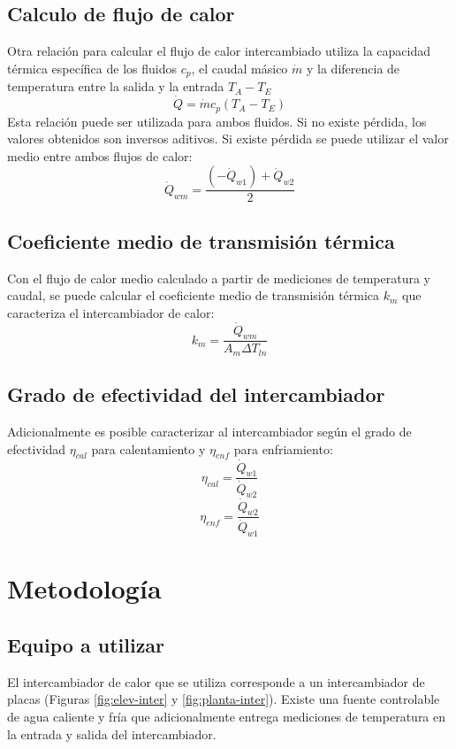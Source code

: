\documentclass[letterpaper,11pt]{article} %
\begin{document}
\subsection{Calculo de flujo de calor}
Otra relación para calcular el flujo de calor intercambiado utiliza la capacidad térmica específica de los fluidos $c_p$, el caudal másico $\dot{m}$ y la diferencia de temperatura entre la salida y la entrada $T_{A}-T_{E}$
\begin{equation}
\dot{Q} = \dot{m}c_p (T_{A}-T_{E})
\end{equation}
Esta relación puede ser utilizada para ambos fluidos. Si no existe pérdida, los valores obtenidos son inversos aditivos. Si existe pérdida se puede utilizar el valor medio entre ambos flujos de calor:
\begin{equation}
\dot{Q}_{wm} = \frac{(-\dot{Q}_{w1}) + \dot{Q}_{w2}}{2}
\end{equation} 
\subsection{Coeficiente medio de transmisión térmica}
Con el flujo de calor medio calculado a partir de mediciones de temperatura y caudal, se puede calcular el coeficiente medio de transmisión térmica $k_m$ que caracteriza el intercambiador de calor:
\begin{equation}
k_m = \frac{\dot{Q}_{wm}}{A_m \Delta T_{ln}}
\end{equation}
\subsection{Grado de efectividad del intercambiador}
Adicionalmente es posible caracterizar al intercambiador según el grado de efectividad $\eta_{cal}$ para calentamiento y $\eta_{enf}$ para enfriamiento:
\begin{equation}
\eta_{cal} = \frac{\dot{Q}_{w1}}{\dot{Q}_{w2}}
\end{equation} 
\begin{equation}
\eta_{enf} = \frac{\dot{Q}_{w2}}{\dot{Q}_{w1}}
\end{equation}



\newpage

\section{Metodología}
\subsection{Equipo a utilizar}
El intercambiador de calor que se utiliza corresponde a un intercambiador de placas (Figuras \ref{fig:elev-inter} y \ref{fig:planta-inter}). Existe una fuente controlable de agua caliente y fría que adicionalmente entrega mediciones de temperatura en la entrada y salida del intercambiador. 
\end{document}

